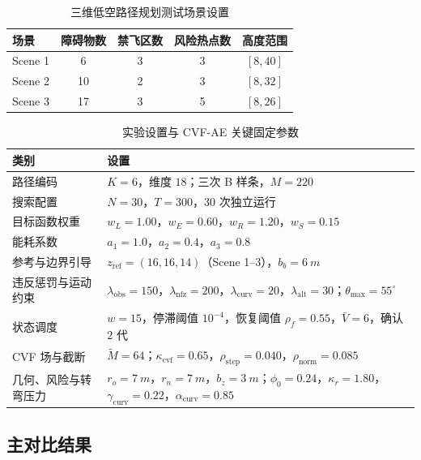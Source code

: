 \begin{table}[!htbp]
\centering
\caption{三维低空路径规划测试场景设置}
\label{tab:scene-setup}
\small
\begin{tabular}{@{}lcccc@{}}
\toprule
场景 & 障碍物数 & 禁飞区数 & 风险热点数 & 高度范围 \\
\midrule
Scene 1 & 6 & 3 & 3 & $[8,40]$ \\
Scene 2 & 10 & 2 & 3 & $[8,32]$ \\
Scene 3 & 17 & 3 & 5 & $[8,26]$ \\
\bottomrule
\end{tabular}
\end{table}


\begin{table}[!htbp]
\centering
\caption{实验设置与 CVF-AE 关键固定参数}
\label{tab:common-setup}
\small
\begin{tabularx}{\linewidth}{@{}l >{\raggedright\arraybackslash}X@{}}
\toprule
类别 & 设置 \\
\midrule
路径编码 & $K=6$，维度 $18$；三次 B 样条，$M=220$ \\
搜索配置 & $N=30$，$T=300$，30 次独立运行 \\
目标函数权重 & $w_L=1.00$，$w_E=0.60$，$w_R=1.20$，$w_S=0.15$ \\
能耗系数 & $a_1=1.0$，$a_2=0.4$，$a_3=0.8$ \\
参考与边界引导 & $z_{\mathrm{ref}}=(16,16,14)$（Scene 1--3），$b_b=\SI{6}{m}$ \\
违反惩罚与运动约束 & $\lambda_{\mathrm{obs}}=150$，$\lambda_{\mathrm{nfz}}=200$，$\lambda_{\mathrm{curv}}=20$，$\lambda_{\mathrm{alt}}=30$；$\theta_{\max}=55^\circ$ \\
状态调度 & $w=15$，停滞阈值 $10^{-4}$，恢复阈值 $\rho_f=0.55$，$\bar V=6$，确认 $2$ 代 \\
CVF 场与截断 & $\widetilde M=64$；$\kappa_{\mathrm{cvf}}=0.65$，$\rho_{\mathrm{step}}=0.040$，$\rho_{\mathrm{norm}}=0.085$ \\
几何、风险与转弯压力 & $r_o=\SI{7}{m}$，$r_n=\SI{7}{m}$，$b_z=\SI{3}{m}$；$\phi_0=0.24$，$\kappa_r=1.80$，$\gamma_{\mathrm{curv}}=0.22$，$\alpha_{\mathrm{curv}}=0.85$ \\
\bottomrule
\end{tabularx}
\end{table}




\subsection{主对比结果}

